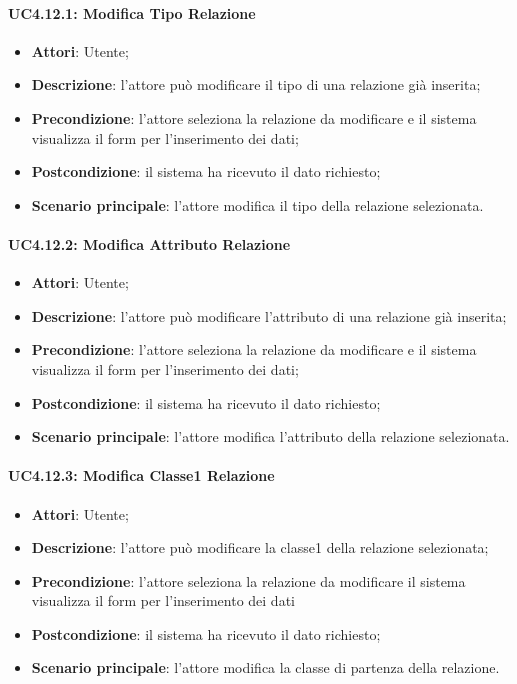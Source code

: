 \paragraph{UC4.12.1: Modifica Tipo Relazione}
\label{UC4.12.1}
\begin{itemize}
	\item \textbf{Attori}: Utente;
	\item \textbf{Descrizione}: l'attore può modificare il tipo di una relazione già inserita;
	\item \textbf{Precondizione}: l'attore seleziona la relazione da modificare e il sistema visualizza il form per l'inserimento dei dati;
	\item \textbf{Postcondizione}: il sistema ha ricevuto il dato richiesto;
	\item \textbf{Scenario principale}: l'attore modifica il tipo della relazione selezionata.
\end{itemize}

\paragraph{UC4.12.2: Modifica Attributo Relazione}
\label{UC4.12.2}
\begin{itemize}
	\item \textbf{Attori}: Utente;
	\item \textbf{Descrizione}: l'attore può modificare l'attributo di una relazione già inserita;
	\item \textbf{Precondizione}: l'attore seleziona la relazione da modificare e il sistema visualizza il form per l'inserimento dei dati;
	\item \textbf{Postcondizione}: il sistema ha ricevuto il dato richiesto;
	\item \textbf{Scenario principale}: l'attore modifica l'attributo della relazione selezionata.
\end{itemize}

\paragraph{UC4.12.3: Modifica Classe1 Relazione}
\label{UC4.12.3}
\begin{itemize}
	\item \textbf{Attori}: Utente;
	\item \textbf{Descrizione}: l'attore può modificare la classe1 della relazione selezionata;
	\item \textbf{Precondizione}: l'attore seleziona la relazione da modificare il sistema visualizza il form per l'inserimento dei dati
	\item \textbf{Postcondizione}: il sistema ha ricevuto il dato richiesto;
	\item \textbf{Scenario principale}: l'attore modifica la classe di partenza della relazione.
\end{itemize}

